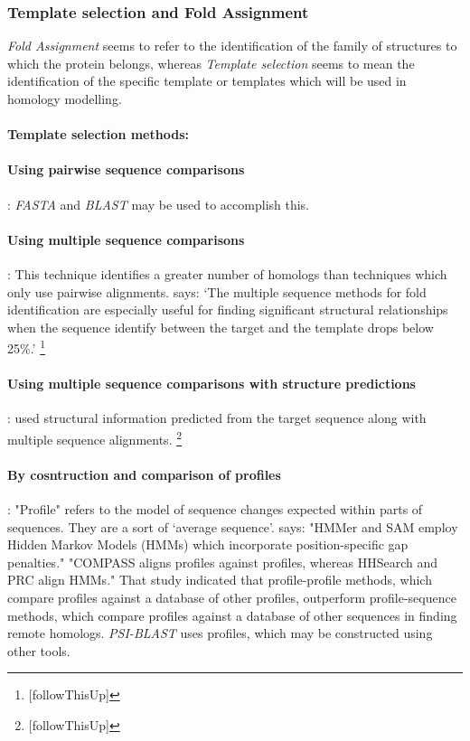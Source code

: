 \documentclass[10pt]{report}
\begin{document}
\subsubsection{Template selection and Fold Assignment}

\textit{Fold Assignment} seems to refer to the identification of the family of structures to which the protein belongs, whereas \textit{Template selection} seems to mean the identification of the specific template or templates which will be used in homology modelling.

\paragraph{Template selection methods:}

\paragraph{Using pairwise sequence comparisons}: \textit{FASTA} and \textit{BLAST} may be used to accomplish this.

\paragraph{Using multiple sequence comparisons}: This technique identifies a greater number of homologs than techniques which only use pairwise alignments. \cite{marti-renom2000com} says: `The multiple sequence methods for fold identification are especially useful for finding significant structural relationships when the sequence identify between the target and the template drops below 25\%.' \footnote{[followThisUp]}

\paragraph{Using multiple sequence comparisons with structure predictions}: \cite{fischer97} used structural information predicted from the target sequence along with multiple sequence alignments. \footnote{[followThisUp]}

\paragraph{By cosntruction and comparison of profiles}: "Profile" refers to the model of sequence changes expected within parts of sequences. They are a sort of `average sequence'. \cite{reid07homologyDetection} says: "HMMer and SAM employ Hidden Markov Models (HMMs) which incorporate position-specific gap penalties." "COMPASS aligns profiles against profiles, whereas HHSearch and PRC align HMMs." That study indicated that profile-profile methods, which compare profiles against a database of other profiles, outperform profile-sequence methods, which compare profiles against a database of other sequences in finding remote homologs. \textit{PSI-BLAST} uses profiles, which may be constructed using other tools.
\end{document}
